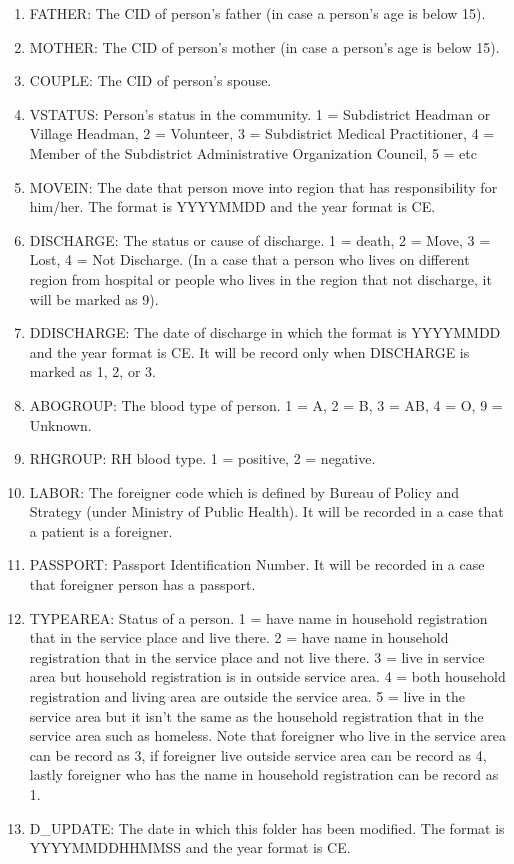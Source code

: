 \begin{enumerate}
  \item FATHER: The CID of person's father (in case a person's age is below 15).
  \item MOTHER: The CID of person's mother (in case a person's age is below 15).
  \item COUPLE: The CID of person's spouse.
  \item VSTATUS: Person's status in the community. 1 = Subdistrict Headman or Village Headman, 2 = Volunteer, 3 = Subdistrict Medical Practitioner, 4 = Member of the Subdistrict Administrative Organization Council, 5 = etc
  \item MOVEIN: The date that person move into region that has responsibility for him/her. The format is YYYYMMDD and the year format is CE.
  \item DISCHARGE: The status or cause of discharge. 1 = death, 2 = Move, 3 = Lost, 4 = Not Discharge. (In a case that a person who lives on different region from hospital or people who lives in the region that not discharge, it will be marked as 9).
  \item DDISCHARGE: The date of discharge in which the format is YYYYMMDD and the year format is CE. It will be record only when DISCHARGE is marked as 1, 2, or 3.
  \item ABOGROUP: The blood type of person. 1 = A, 2 = B, 3 = AB, 4 = O, 9 = Unknown.
  \item RHGROUP: RH blood type. 1 = positive, 2 = negative.
  \item LABOR: The foreigner code which is defined by Bureau of Policy and Strategy (under Ministry of Public Health). It will be recorded in a case that a patient is a foreigner.
  \item PASSPORT: Passport Identification Number. It will be recorded in a case that foreigner person has a passport.
  \item TYPEAREA: Status of a person. 1 = have name in household registration that in the service place and live there. 2 = have name in household registration that in the service place and not live there. 3 = live in service area but household registration is in outside service area. 4 = both household registration and living area are outside the service area. 5 = live in the service area but it isn't the same as the household registration that in the service area such as homeless. Note that foreigner who live in the service area can be record as 3, if foreigner live outside service area can be record as 4, lastly foreigner who has the name in household registration can be record as 1.
  \item D\_UPDATE: The date in which this folder has been modified. The format is YYYYMMDDHHMMSS and the year format is CE.
\end{enumerate}